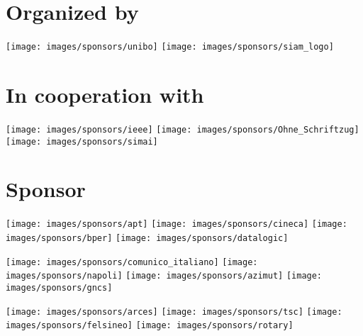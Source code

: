 \newpage
{}

\setlength{\columnseprule}{0pt}
\begin{center}

\section*{Organized by}
\vspace{0.1cm}

\begin{multicols}{4}
\texttt{[image: images/sponsors/unibo]}    
\texttt{[image: images/sponsors/siam\_logo]} 
\end{multicols}

\section*{In cooperation with}
\vspace{0.1cm}

\begin{multicols}{4}
\texttt{[image: images/sponsors/ieee]} 
\texttt{[image: images/sponsors/Ohne\_Schriftzug]} 
\texttt{[image: images/sponsors/simai]}
\end{multicols}

\section*{Sponsor}
\vspace{0.1cm}

\begin{multicols}{4}
\texttt{[image: images/sponsors/apt]}    
\texttt{[image: images/sponsors/cineca]} 
\texttt{[image: images/sponsors/bper]}
\texttt{[image: images/sponsors/datalogic]}
\end{multicols}

\begin{multicols}{4}
\texttt{[image: images/sponsors/comunico\_italiano]} 
\texttt{[image: images/sponsors/napoli]} 
\texttt{[image: images/sponsors/azimut]}
\texttt{[image: images/sponsors/gncs]}
\end{multicols}

\begin{multicols}{4}
\texttt{[image: images/sponsors/arces]} 
\texttt{[image: images/sponsors/tsc]} 
\texttt{[image: images/sponsors/felsineo]}
\texttt{[image: images/sponsors/rotary]}
\end{multicols}


\end{center}
